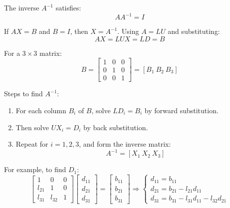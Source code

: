 \documentclass[a4paper,12pt]{article}
\begin{document}
The inverse \( A^{-1} \) satisfies:
\begin{equation}
	AA^{-1} = I \tag{7.6}
\end{equation}

If \( AX = B \) and \( B = I \), then \( X = A^{-1} \). Using \( A = LU \) and substituting:
\[
A X = LU X = L D = B
\]

For a \( 3 \times 3 \) matrix:
\[
B = 
\begin{bmatrix}
	1 & 0 & 0 \\
	0 & 1 & 0 \\
	0 & 0 & 1
\end{bmatrix}
= [B_1\ B_2\ B_3]
\]

Steps to find \( A^{-1} \):

\begin{enumerate}
	\item For each column \( B_i \) of \( B \), solve \( L D_i = B_i \) by forward substitution.
	\item Then solve \( U X_i = D_i \) by back substitution.
	\item Repeat for \( i = 1, 2, 3 \), and form the inverse matrix:
	\[
	A^{-1} = [X_1\ X_2\ X_3]
	\]
\end{enumerate}

For example, to find \( D_1 \):
\[
\begin{bmatrix}
	1 & 0 & 0 \\
	l_{21} & 1 & 0 \\
	l_{31} & l_{32} & 1
\end{bmatrix}
\begin{bmatrix}
	d_{11} \\ d_{21} \\ d_{31}
\end{bmatrix}
=
\begin{bmatrix}
	b_{11} \\ b_{21} \\ b_{31}
\end{bmatrix}
\Rightarrow
\left\{
\begin{array}{l}
	d_{11} = b_{11} \\
	d_{21} = b_{21} - l_{21} d_{11} \\
	d_{31} = b_{31} - l_{31} d_{11} - l_{32} d_{21}
\end{array}
\right.
\]
\end{document}
